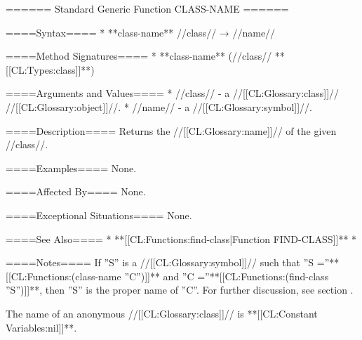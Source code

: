 ====== Standard Generic Function CLASS-NAME ======

====Syntax====
  * **class-name** //class// → //name//

====Method Signatures====
  * **class-name** (//class// **[[CL:Types:class]]**)

====Arguments and Values====
  * //class// - a //[[CL:Glossary:class]]// //[[CL:Glossary:object]]//.
  * //name// - a //[[CL:Glossary:symbol]]//.

====Description====
Returns the //[[CL:Glossary:name]]// of the given //class//.

====Examples====
None.

====Affected By====
None.

====Exceptional Situations====
None.

====See Also====
  * **[[CL:Functions:find-class|Function FIND-CLASS]]**
  * {\secref\Classes}

====Notes====
If ''S'' is a //[[CL:Glossary:symbol]]// such that ''S =''**[[CL:Functions:(class-name ''C'')]]** and ''C =''**[[CL:Functions:(find-class ''S'')]]**, then ''S'' is the proper name of ''C''. For further discussion, see section {\secref\Classes}.

The name of an anonymous //[[CL:Glossary:class]]// is **[[CL:Constant Variables:nil]]**.

